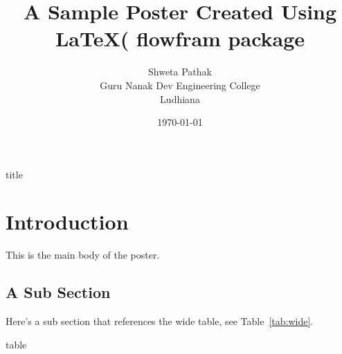 \documentclass[a0,landscape]{a0poster}
\title{A Sample Poster Created Using \LaTeX ( flowfram package}
\author{Shweta Pathak\\
Guru Nanak Dev Engineering College\\
Ludhiana }
\date{\today}
\begin{document}
\begin{staticcontents*}{title}
\maketitle
\end{staticcontents*}
\thispagestyle{empty}

\section{Introduction}
This is the main body of the poster.
\blindtext \vspace{4cm}

\subsection{A Sub Section}
Here's a sub section that references the wide
table, see Table~\ref{tab:wide}.
\blindtext \vspace{4cm}


\begin{staticcontents*}{table}
\begin{statictable}
\caption{A very wide table that spans two columns}
\label{tab:wide}
\end{statictable}
\end{staticcontents*}
\end{document}
